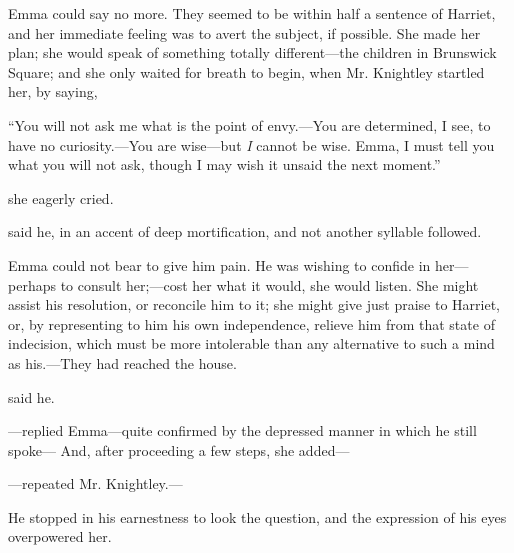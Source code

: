 Emma could say no more. They seemed to be within half a sentence of Harriet, and her immediate feeling was to avert the subject, if possible. She made her plan; she would speak of something totally different---the children in Brunswick Square; and she only waited for breath to begin, when Mr. Knightley startled her, by saying,

“You will not ask me what is the point of envy.---You are determined, I see, to have no curiosity.---You are wise---but {\em I} cannot be wise. Emma, I must tell you what you will not ask, though I may wish it unsaid the next moment.”

 she eagerly cried. 

 said he, in an accent of deep mortification, and not another syllable followed.

Emma could not bear to give him pain. He was wishing to confide in her---perhaps to consult her;---cost her what it would, she would listen. She might assist his resolution, or reconcile him to it; she might give just praise to Harriet, or, by representing to him his own independence, relieve him from that state of indecision, which must be more intolerable than any alternative to such a mind as his.---They had reached the house.

 said he.

---replied Emma---quite confirmed by the depressed manner in which he still spoke--- And, after proceeding a few steps, she added---

---repeated Mr. Knightley.---

He stopped in his earnestness to look the question, and the expression of his eyes overpowered her.

